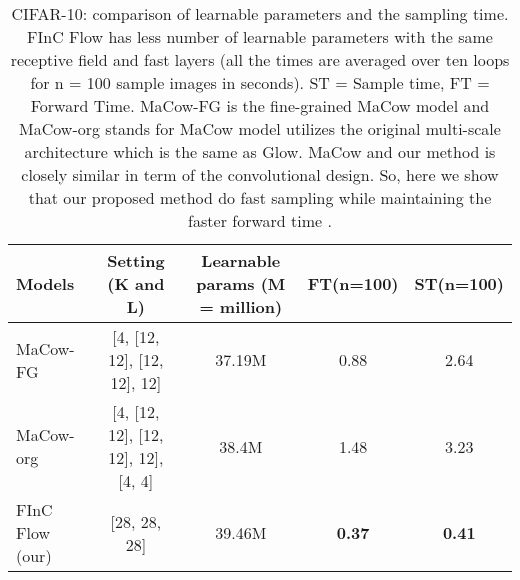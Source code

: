 \documentclass[a4paper,twoside]{article}
\theoremstyle{definition}
\begin{document}











































































 
\begin{table*}[!t]
    \centering
    \caption{CIFAR-10: comparison of learnable parameters and the sampling time. FInC Flow has less number of learnable parameters with the same receptive field and fast layers (all the times are averaged over ten loops for n = 100 sample images in seconds). ST = Sample time, FT = Forward Time. MaCow-FG is the fine-grained MaCow model and MaCow-org stands for MaCow model utilizes the original multi-scale architecture which is the same as Glow. MaCow and our method is closely similar in term of the convolutional design. So, here we show that our proposed method do fast sampling while maintaining the faster forward time .}
        \begin{tabular}{l  c  c  c c}
        \toprule
            Models    & Setting (K and L) & Learnable params (M = million)  & FT(n=100) & ST(n=100) \\ 
            \midrule
            MaCow-FG & [4, [12, 12], [12, 12], 12]  &  37.19M   & 0.88  & 2.64  \\
            MaCow-org &  [4, [12, 12], [12, 12], 12], [4, 4]  & 38.4M & 1.48  & 3.23 \\ 
FInC Flow (our) &  [28, 28, 28] & 39.46M  & \textbf{0.37}  & \textbf{0.41}   \\
            \bottomrule
        \end{tabular}
    
    \label{table:params}
\end{table*}
\vspace{2em}
\end{document}
